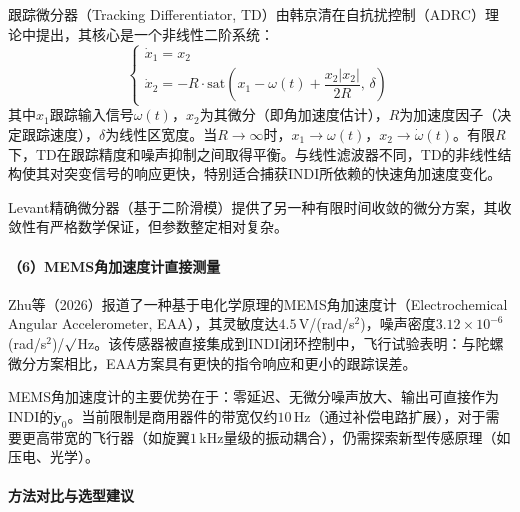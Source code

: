 跟踪微分器（Tracking Differentiator, TD）由韩京清在自抗扰控制（ADRC）理论中提出，其核心是一个非线性二阶系统：
\begin{equation}
    \begin{cases}
        \dot{x}_1 = x_2 \\
        \dot{x}_2 = -R \cdot \mathrm{sat}\left(x_1 - \omega(t) + \dfrac{x_2|x_2|}{2R},\, \delta\right)
    \end{cases}
    \label{eq:tracking_diff}
\end{equation}
其中$x_1$跟踪输入信号$\omega(t)$，$x_2$为其微分（即角加速度估计），$R$为加速度因子（决定跟踪速度），$\delta$为线性区宽度。当$R\to\infty$时，$x_1\to\omega(t)$，$x_2\to\dot{\omega}(t)$。有限$R$下，TD在跟踪精度和噪声抑制之间取得平衡。与线性滤波器不同，TD的非线性结构使其对突变信号的响应更快，特别适合捕获INDI所依赖的快速角加速度变化。

Levant精确微分器\cite{levant1998robust}（基于二阶滑模）提供了另一种有限时间收敛的微分方案，其收敛性有严格数学保证，但参数整定相对复杂。

\paragraph{（6）MEMS角加速度计直接测量}

Zhu等（2026）\cite{zhu2026mems}报道了一种基于电化学原理的MEMS角加速度计（Electrochemical Angular Accelerometer, EAA），其灵敏度达$4.5$\,V/(rad/s$^2$)，噪声密度$3.12\times10^{-6}$\,(rad/s$^2$)/$\surd$Hz。该传感器被直接集成到INDI闭环控制中，飞行试验表明：与陀螺微分方案相比，EAA方案具有更快的指令响应和更小的跟踪误差\cite{zhu2026mems}。

MEMS角加速度计的主要优势在于：零延迟、无微分噪声放大、输出可直接作为INDI的$\dot{\mathbf{y}}_0$。当前限制是商用器件的带宽仅约$10$\,Hz（通过补偿电路扩展），对于需要更高带宽的飞行器（如旋翼$1$\,kHz量级的振动耦合），仍需探索新型传感原理（如压电、光学）。

\paragraph{方法对比与选型建议}

